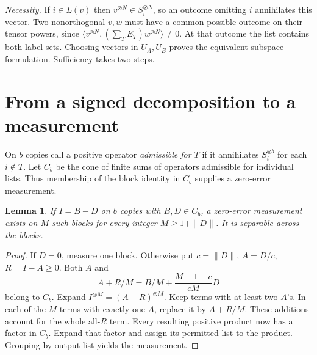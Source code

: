 \documentclass[11pt,a4paper]{article}
\newtheorem{lemma}[theorem]{Lemma}
\theoremstyle{remark}
\begin{document}
\emph{Necessity.}
If \(i\in L(v)\) then \(v^{\otimes N}\in S_i^{\otimes N}\), so an outcome omitting \(i\) annihilates this vector. Two nonorthogonal \(v,w\) must have a common possible outcome on their tensor powers, since \(\langle v^{\otimes N},(\sum_T E_T)w^{\otimes N}\rangle\ne0\). At that outcome the list contains both label sets. Choosing vectors in \(U_A,U_B\) proves the equivalent subspace formulation. Sufficiency takes two steps.

\section{From a signed decomposition to a measurement}

On \(b\) copies call a positive operator \emph{admissible for \(T\)} if it annihilates \(S_i^{\otimes b}\) for each \(i\notin T\). Let \(C_b\) be the cone of finite sums of operators admissible for individual lists. Thus membership of the block identity in \(C_b\) supplies a zero-error measurement.

\begin{lemma}\label{activate}
If \(I=B-D\) on \(b\) copies with \(B,D\in C_b\), a zero-error measurement exists on \(M\) such blocks for every integer \(M\ge1+\|D\|\). It is separable across the blocks.
\end{lemma}
\begin{proof}
If \(D=0\), measure one block. Otherwise put \(c=\|D\|\), \(A=D/c\), \(R=I-A\ge0\). Both \(A\) and
\[
           A+R/M=B/M+\frac{M-1-c}{cM}D
\]
belong to \(C_b\). Expand \(I^{\otimes M}=(A+R)^{\otimes M}\). Keep terms with at least two \(A\)'s. In each of the \(M\) terms with exactly one \(A\), replace it by \(A+R/M\). These additions account for the whole all-\(R\) term. Every resulting positive product now has a factor in \(C_b\). Expand that factor and assign its permitted list to the product. Grouping by output list yields the measurement.
\end{proof}
\end{document}
